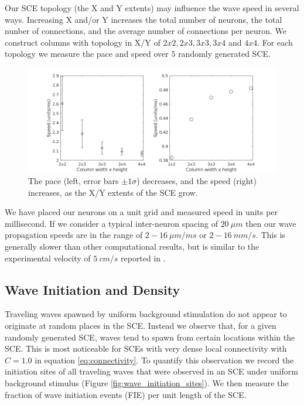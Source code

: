 \documentclass[12pt]{article}
\begin{document}
\color{red}
Our SCE topology (the X and Y extents) may influence the wave speed in several ways.
Increasing X and/or Y increases the total number of neurons, the total nunber of connections, and the average number of connections per neuron.
We construct columns with topology in X/Y of $2x2, 2x3, 3x3, 3x4$ and $4x4$.
For each topology we measure the pace and speed over $5$ randomly generated SCE.
\begin{figure}[!htb]
 \caption{ The pace (left, error bars $\pm 1 \sigma$) decreases, and the speed (right) increases, as the X/Y extents of the SCE grow.}
 \label{fig:delay_topology}
 \centering
   \includegraphics[width=\textwidth]{fig/WaveSpeed_Topology}
\end{figure}
\color{black}

\color{red}
We have placed our neurons on a unit grid and measured speed in units per millisecond.
If we consider a typical inter-neuron spacing of $20~\mu m$ then our wave propagation speeds are in the range of $2-16~\mu m/ms$ or $2-16~mm/s$.
This is generally slower than other computational results, but is similar to the experimental velocity of $5~cm/s$ reported in \parencite{Golomb1997}.
\color{black}

\FloatBarrier


\subsection{Wave Initiation and Density} \label{sub:wave_initiation}
Traveling waves spawned by uniform background stimulation do not appear to originate at random places in the SCE.
Instead we observe that, for a given randomly generated SCE, waves tend to spawn from certain locations within the SCE.
This is most noticeable for SCEs with very dense local connectivity with $C=1.0$ in equation \ref{eq:connectivity}.
To quantify this observation we record the initiation sites of all traveling waves that were observed in an SCE under uniform background stimulus (Figure \ref{fig:wave_initiation_sites}).
We then measure the fraction of wave initiation events (FIE) per unit length of the SCE.
\end{document}
